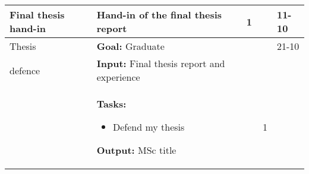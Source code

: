 \begin{longtable}{|p{2cm}|p{10cm}|p{1cm}|p{1cm}|}
Final thesis hand-in 	& Hand-in of the final thesis report & 1 & 11-10 \\ \hline




Thesis  & \textbf{Goal:} Graduate &  & 21-10  \\ 
defence &\textbf{Input:} Final thesis report and experience & & \\
& \textbf{Tasks:}
\begin{itemize}
\item Defend my thesis
\end{itemize} 
\textbf{Output:} MSc title & \noindent \begin{itemize}[leftmargin=*]
\item[1]
\end{itemize} & \\ \hline
			
\end{longtable}
